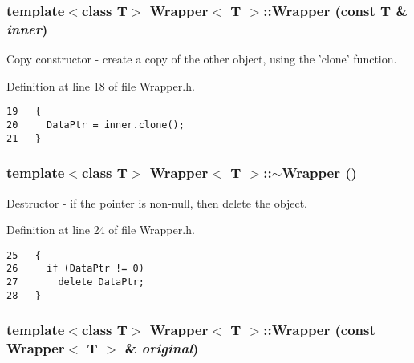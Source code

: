 \subsubsection{\setlength{\rightskip}{0pt plus 5cm}template$<$class T$>$ {\bf Wrapper}$<$ T $>$::{\bf Wrapper} (const T \& {\em inner})\hspace{0.3cm}{\tt  [inline]}}\label{classWrapper_75fb68554d62529a071016d297018dea}


Copy constructor - create a copy of the other object, using the 'clone' function. 



Definition at line 18 of file Wrapper.h.

\begin{Code}\begin{verbatim}19   {
20     DataPtr = inner.clone();
21   }
\end{verbatim}
\end{Code}


\subsubsection{\setlength{\rightskip}{0pt plus 5cm}template$<$class T$>$ {\bf Wrapper}$<$ T $>$::$\sim${\bf Wrapper} ()\hspace{0.3cm}{\tt  [inline]}}\label{classWrapper_5396fe1ce47468f5ceeec85eb423695d}


Destructor - if the pointer is non-null, then delete the object. 



Definition at line 24 of file Wrapper.h.

\begin{Code}\begin{verbatim}25   {
26     if (DataPtr != 0)
27       delete DataPtr;
28   }
\end{verbatim}
\end{Code}


\subsubsection{\setlength{\rightskip}{0pt plus 5cm}template$<$class T$>$ {\bf Wrapper}$<$ T $>$::{\bf Wrapper} (const {\bf Wrapper}$<$ T $>$ \& {\em original})\hspace{0.3cm}{\tt  [inline]}}\label{classWrapper_61fbc2f8719cbbb237bab3c94aef6a53}


